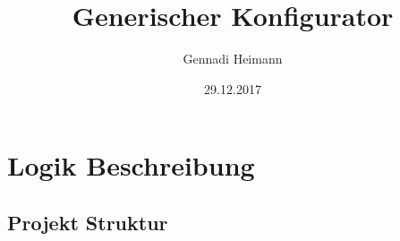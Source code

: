 \documentclass{article}
\begin{document}
\begin{titlepage}

\author{Gennadi Heimann} 
\title{Generischer Konfigurator} 
\date{29.12.2017} 
\maketitle
\end{titlepage}

\section{Logik Beschreibung}

\subsection{Projekt Struktur}
\end{document}
